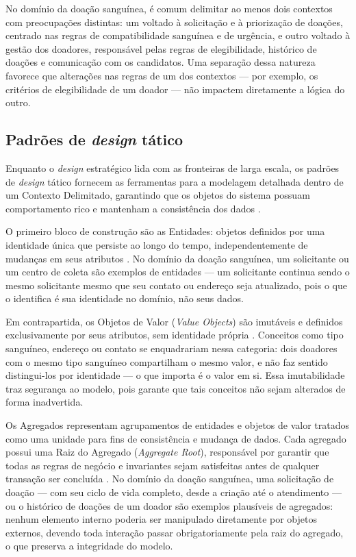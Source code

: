 No domínio da doação sanguínea, é comum delimitar ao menos dois contextos com preocupações distintas: um voltado à solicitação e à priorização de doações, centrado nas regras de compatibilidade sanguínea e de urgência, e outro voltado à gestão dos doadores, responsável pelas regras de elegibilidade, histórico de doações e comunicação com os candidatos. Uma separação dessa natureza favorece que alterações nas regras de um dos contextos --- por exemplo, os critérios de elegibilidade de um doador --- não impactem diretamente a lógica do outro.

\subsection{Padrões de \textit{design} tático}

Enquanto o \textit{design} estratégico lida com as fronteiras de larga escala, os padrões de \textit{design} tático fornecem as ferramentas para a modelagem detalhada dentro de um Contexto Delimitado, garantindo que os objetos do sistema possuam comportamento rico e mantenham a consistência dos dados \cite{evans2003}.

O primeiro bloco de construção são as Entidades: objetos definidos por uma identidade única que persiste ao longo do tempo, independentemente de mudanças em seus atributos \cite{vernon2013}. No domínio da doação sanguínea, um solicitante ou um centro de coleta são exemplos de entidades --- um solicitante continua sendo o mesmo solicitante mesmo que seu contato ou endereço seja atualizado, pois o que o identifica é sua identidade no domínio, não seus dados.

Em contrapartida, os Objetos de Valor (\textit{Value Objects}) são imutáveis e definidos exclusivamente por seus atributos, sem identidade própria \cite{evans2003}. Conceitos como tipo sanguíneo, endereço ou contato se enquadrariam nessa categoria: dois doadores com o mesmo tipo sanguíneo compartilham o mesmo valor, e não faz sentido distingui-los por identidade --- o que importa é o valor em si. Essa imutabilidade traz segurança ao modelo, pois garante que tais conceitos não sejam alterados de forma inadvertida.

Os Agregados representam agrupamentos de entidades e objetos de valor tratados como uma unidade para fins de consistência e mudança de dados. Cada agregado possui uma Raiz do Agregado (\textit{Aggregate Root}), responsável por garantir que todas as regras de negócio e invariantes sejam satisfeitas antes de qualquer transação ser concluída \cite{vernon2013}. No domínio da doação sanguínea, uma solicitação de doação --- com seu ciclo de vida completo, desde a criação até o atendimento --- ou o histórico de doações de um doador são exemplos plausíveis de agregados: nenhum elemento interno poderia ser manipulado diretamente por objetos externos, devendo toda interação passar obrigatoriamente pela raiz do agregado, o que preserva a integridade do modelo.

